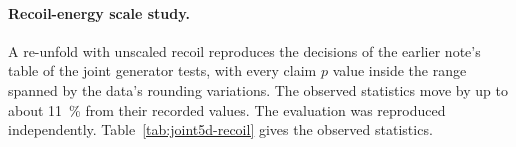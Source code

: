 \paragraph{Recoil-energy scale study.} A re-unfold with unscaled recoil reproduces the decisions of the earlier note's table of the joint generator tests, with every claim $p$ value inside the range spanned by the data's rounding variations. The observed statistics move by up to about \SI{11}{\percent} from their recorded values. The evaluation was reproduced independently. Table~\ref{tab:joint5d-recoil} gives the observed statistics.
